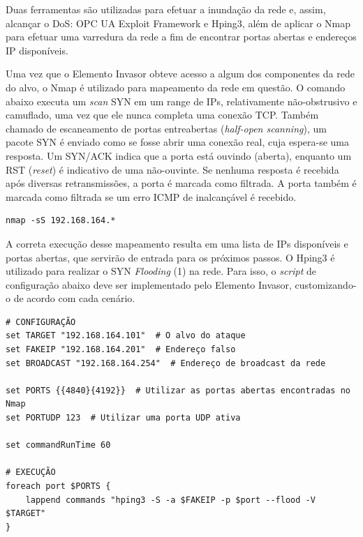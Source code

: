     Duas ferramentas são utilizadas para efetuar a inundação da rede e, assim, alcançar o DoS: OPC UA Exploit Framework e Hping3, além de aplicar o Nmap para efetuar uma varredura da rede a fim de encontrar portas abertas e endereços IP disponíveis. 

    Uma vez que o Elemento Invasor obteve acesso a algum dos componentes da rede do alvo, o Nmap é utilizado para mapeamento da rede em questão. O comando abaixo executa um \textit{scan} SYN em um range de IPs, relativamente não-obstrusivo e camuflado, uma vez que ele nunca completa uma conexão TCP. Também chamado de escaneamento de portas entreabertas (\textit{half-open scanning}), um pacote SYN é enviado como se fosse abrir uma conexão real, cuja espera-se uma resposta. Um SYN/ACK indica que a porta está ouvindo (aberta), enquanto um RST (\textit{reset}) é indicativo de uma não-ouvinte. Se nenhuma resposta é recebida após diversas retransmissões, a porta é marcada como filtrada. A porta também é marcada como filtrada se um erro ICMP de inalcançável é recebido.

    \begin{verbatim}
nmap -sS 192.168.164.*
    \end{verbatim}

    A correta execução desse mapeamento resulta em uma lista de IPs disponíveis e portas abertas, que servirão de entrada para os próximos passos. O Hping3 é utilizado para realizar o SYN \textit{Flooding} (1) na rede. Para isso, o \textit{script} de configuração abaixo deve ser implementado pelo Elemento Invasor, customizando-o de acordo com cada cenário.

    \begin{verbatim}
# CONFIGURAÇÃO
set TARGET "192.168.164.101"  # O alvo do ataque
set FAKEIP "192.168.164.201"  # Endereço falso
set BROADCAST "192.168.164.254"  # Endereço de broadcast da rede

set PORTS {{4840}{4192}}  # Utilizar as portas abertas encontradas no Nmap
set PORTUDP 123  # Utilizar uma porta UDP ativa

set commandRunTime 60

# EXECUÇÃO
foreach port $PORTS {
    lappend commands "hping3 -S -a $FAKEIP -p $port --flood -V $TARGET"
}
    \end{verbatim}

